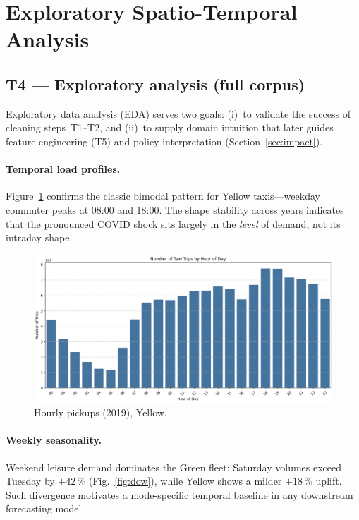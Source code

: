 \documentclass[conference]{IEEEtran}
\begin{document}
\section{Exploratory Spatio-Temporal Analysis}\label{sec:eda}
\subsection{T4 — Exploratory analysis (full corpus)}
\label{sec:t4-explore}

Exploratory data analysis (EDA) serves two goals:
(i)~to validate the success of cleaning steps~T1–T2, and
(ii)~to supply domain intuition that later guides feature engineering (T5) and
policy interpretation (Section~\ref{sec:impact}).

\paragraph*{Temporal load profiles.}
Figure~\ref{fig:hour-of-day} confirms the classic bimodal pattern for Yellow
taxis—weekday commuter peaks at 08:00 and 18:00. The
shape stability across years indicates that the pronounced COVID shock sits
largely in the \emph{level} of demand, not its intraday shape.

\begin{figure}[htbp]
  \centering
  \includegraphics[width=0.95\linewidth]{figures/hour_of_day_trips.png}
  \caption{Hourly pickups (2019), Yellow.}
  \label{fig:hour-of-day}
\end{figure}

\paragraph*{Weekly seasonality.}
Weekend leisure demand dominates the Green fleet: Saturday volumes exceed
Tuesday by \(+42\,\%\) (Fig.~\ref{fig:dow}), while Yellow shows a milder
\( +18\,\% \) uplift.  Such divergence motivates a mode-specific temporal
baseline in any downstream forecasting model.
\end{document}
